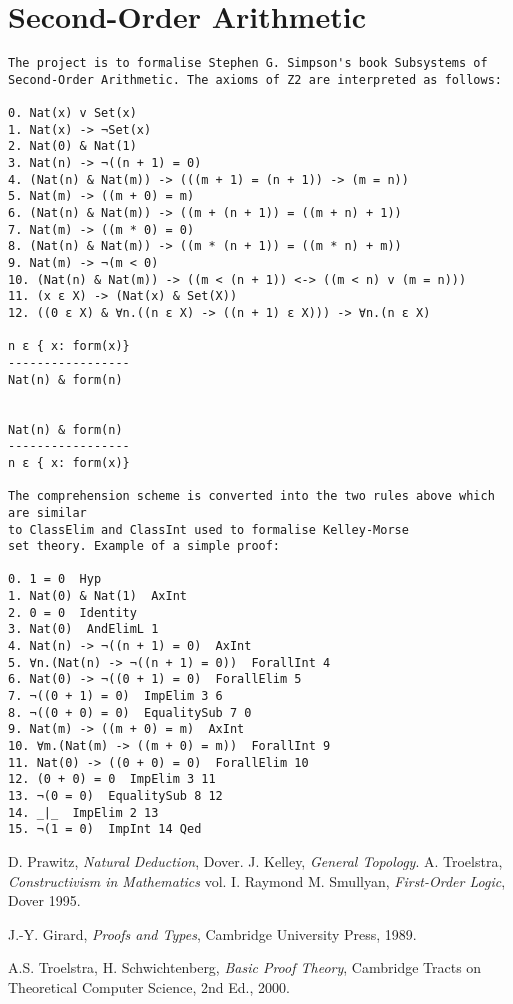 \documentclass[12pt,leqno]{article}
\numberwithin{equation}{section}
\begin{document}
\section*{Second-Order Arithmetic}

\begin{verbatim}
The project is to formalise Stephen G. Simpson's book Subsystems of 
Second-Order Arithmetic. The axioms of Z2 are interpreted as follows:

0. Nat(x) v Set(x) 
1. Nat(x) -> ¬Set(x) 
2. Nat(0) & Nat(1) 
3. Nat(n) -> ¬((n + 1) = 0) 
4. (Nat(n) & Nat(m)) -> (((m + 1) = (n + 1)) -> (m = n)) 
5. Nat(m) -> ((m + 0) = m) 
6. (Nat(n) & Nat(m)) -> ((m + (n + 1)) = ((m + n) + 1)) 
7. Nat(m) -> ((m * 0) = 0) 
8. (Nat(n) & Nat(m)) -> ((m * (n + 1)) = ((m * n) + m)) 
9. Nat(m) -> ¬(m < 0) 
10. (Nat(n) & Nat(m)) -> ((m < (n + 1)) <-> ((m < n) v (m = n))) 
11. (x ε X) -> (Nat(x) & Set(X)) 
12. ((0 ε X) & ∀n.((n ε X) -> ((n + 1) ε X))) -> ∀n.(n ε X) 

n ε { x: form(x)}
-----------------
Nat(n) & form(n)


Nat(n) & form(n)
-----------------
n ε { x: form(x)}

The comprehension scheme is converted into the two rules above which are similar
to ClassElim and ClassInt used to formalise Kelley-Morse
set theory. Example of a simple proof:

0. 1 = 0  Hyp 
1. Nat(0) & Nat(1)  AxInt 
2. 0 = 0  Identity 
3. Nat(0)  AndElimL 1
4. Nat(n) -> ¬((n + 1) = 0)  AxInt 
5. ∀n.(Nat(n) -> ¬((n + 1) = 0))  ForallInt 4
6. Nat(0) -> ¬((0 + 1) = 0)  ForallElim 5
7. ¬((0 + 1) = 0)  ImpElim 3 6
8. ¬((0 + 0) = 0)  EqualitySub 7 0
9. Nat(m) -> ((m + 0) = m)  AxInt 
10. ∀m.(Nat(m) -> ((m + 0) = m))  ForallInt 9
11. Nat(0) -> ((0 + 0) = 0)  ForallElim 10
12. (0 + 0) = 0  ImpElim 3 11
13. ¬(0 = 0)  EqualitySub 8 12
14. _|_  ImpElim 2 13
15. ¬(1 = 0)  ImpInt 14 Qed

\end{verbatim}


\begin{thebibliography}{1}
 D. Prawitz, \emph{Natural Deduction}, Dover.
 J. Kelley, \emph{General Topology}.
 A. Troelstra, \emph{Constructivism in Mathematics} vol. I.	
Raymond M. Smullyan,
\textit{First-Order Logic}, Dover 1995.

J.-Y. Girard,
\textit{Proofs and Types}, Cambridge University Press, 1989.


A.S. Troelstra, H. Schwichtenberg,
\textit{Basic Proof Theory}, Cambridge Tracts on Theoretical Computer Science, 2nd Ed., 2000.

	
\end{thebibliography}



 
 
\end{document}
